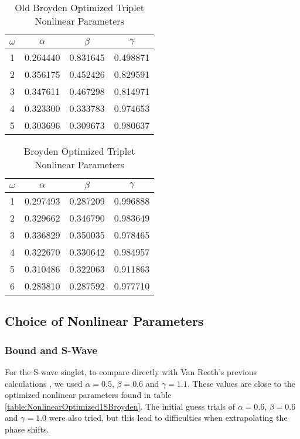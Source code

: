 \documentclass[Dissertation.tex]{subfiles}
\begin{document}
\setlength{\abovecaptionskip}{6pt}   %
\setlength{\belowcaptionskip}{6pt}   %
\begin{table}[ht]
\caption{Old Broyden Optimized Triplet Nonlinear Parameters} %
\centering
\begin{tabular}{c c c c}
\hline\hline
$\omega$ & $\alpha$ & $\beta$ & $\gamma$ \\ [0.5ex]
\hline
1 & 0.264440 & 0.831645 & 0.498871 \\
2 & 0.356175 & 0.452426 & 0.829591 \\
3 & 0.347611 & 0.467298 & 0.814971 \\
4 & 0.323300 & 0.333783 & 0.974653 \\
5 & 0.303696 & 0.309673 & 0.980637 \\
\hline\hline
\end{tabular}
\label{table:NonlinearOptimized3SBroydenoLD}
\end{table}

\setlength{\abovecaptionskip}{6pt}   %
\setlength{\belowcaptionskip}{6pt}   %
\begin{table}[ht]
\caption{Broyden Optimized Triplet Nonlinear Parameters} %
\centering
\begin{tabular}{c c c c}
\hline\hline
$\omega$ & $\alpha$ & $\beta$ & $\gamma$ \\ [0.5ex]
\hline
1 & 0.297493 & 0.287209 & 0.996888 \\
2 & 0.329662 & 0.346790 & 0.983649 \\
3 & 0.336829 & 0.350035 & 0.978465 \\
4 & 0.322670 & 0.330642 & 0.984957 \\
5 & 0.310486 & 0.322063 & 0.911863 \\
6 & 0.283810 & 0.287592 & 0.977710 \\
\hline\hline
\end{tabular}
\label{table:NonlinearOptimized3SBroyden}
\end{table}

\subsection{Choice of Nonlinear Parameters}
\subsubsection{Bound and S-Wave}
For the S-wave singlet, to compare directly with Van Reeth's previous calculations \cite{VanReeth2003}, we used $\alpha = 0.5$, $\beta = 0.6$ and $\gamma = 1.1$.  These values are close to the optimized nonlinear parameters found in table \ref{table:NonlinearOptimized1SBroyden}.  The initial guess trials of $\alpha = 0.6$, $\beta = 0.6$ and $\gamma = 1.0$ were also tried, but this lead to difficulties when extrapolating the phase shifts.
\end{document}
